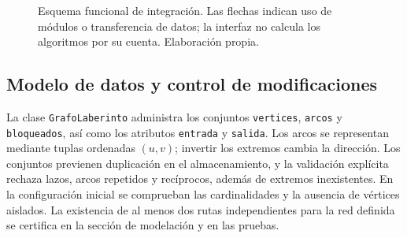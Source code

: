 \documentclass[11pt,a4paper]{article}
\begin{document}
\begin{figure}[H]
\centering
{}
\caption{Esquema funcional de integración. Las flechas indican uso de módulos o transferencia de datos; la interfaz no calcula los algoritmos por su cuenta. Elaboración propia.}
\end{figure}

\subsection{Modelo de datos y control de modificaciones}
La clase \texttt{GrafoLaberinto} administra los conjuntos \texttt{vertices}, \texttt{arcos} y \texttt{bloqueados}, así como los atributos \texttt{entrada} y \texttt{salida}. Los arcos se representan mediante tuplas ordenadas $(u,v)$; invertir los extremos cambia la dirección. Los conjuntos previenen duplicación en el almacenamiento, y la validación explícita rechaza lazos, arcos repetidos y recíprocos, además de extremos inexistentes. En la configuración inicial se comprueban las cardinalidades y la ausencia de vértices aislados. La existencia de al menos dos rutas independientes para la red definida se certifica en la sección de modelación y en las pruebas.
\end{document}
